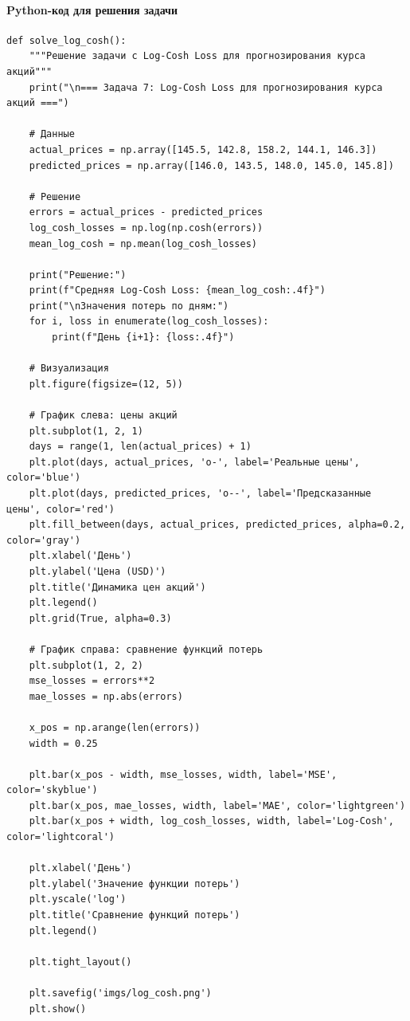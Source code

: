 \paragraph*{Python-код для решения задачи}
\begin{verbatim}
def solve_log_cosh():
    """Решение задачи с Log-Cosh Loss для прогнозирования курса акций"""
    print("\n=== Задача 7: Log-Cosh Loss для прогнозирования курса акций ===")
    
    # Данные
    actual_prices = np.array([145.5, 142.8, 158.2, 144.1, 146.3])
    predicted_prices = np.array([146.0, 143.5, 148.0, 145.0, 145.8])
    
    # Решение
    errors = actual_prices - predicted_prices
    log_cosh_losses = np.log(np.cosh(errors))
    mean_log_cosh = np.mean(log_cosh_losses)
    
    print("Решение:")
    print(f"Средняя Log-Cosh Loss: {mean_log_cosh:.4f}")
    print("\nЗначения потерь по дням:")
    for i, loss in enumerate(log_cosh_losses):
        print(f"День {i+1}: {loss:.4f}")
    
    # Визуализация
    plt.figure(figsize=(12, 5))
    
    # График слева: цены акций
    plt.subplot(1, 2, 1)
    days = range(1, len(actual_prices) + 1)
    plt.plot(days, actual_prices, 'o-', label='Реальные цены', color='blue')
    plt.plot(days, predicted_prices, 'o--', label='Предсказанные цены', color='red')
    plt.fill_between(days, actual_prices, predicted_prices, alpha=0.2, color='gray')
    plt.xlabel('День')
    plt.ylabel('Цена (USD)')
    plt.title('Динамика цен акций')
    plt.legend()
    plt.grid(True, alpha=0.3)
    
    # График справа: сравнение функций потерь
    plt.subplot(1, 2, 2)
    mse_losses = errors**2
    mae_losses = np.abs(errors)
    
    x_pos = np.arange(len(errors))
    width = 0.25
    
    plt.bar(x_pos - width, mse_losses, width, label='MSE', color='skyblue')
    plt.bar(x_pos, mae_losses, width, label='MAE', color='lightgreen')
    plt.bar(x_pos + width, log_cosh_losses, width, label='Log-Cosh', color='lightcoral')
    
    plt.xlabel('День')
    plt.ylabel('Значение функции потерь')
    plt.yscale('log')
    plt.title('Сравнение функций потерь')
    plt.legend()
    
    plt.tight_layout()
    
    plt.savefig('imgs/log_cosh.png')
    plt.show()
\end{verbatim}
